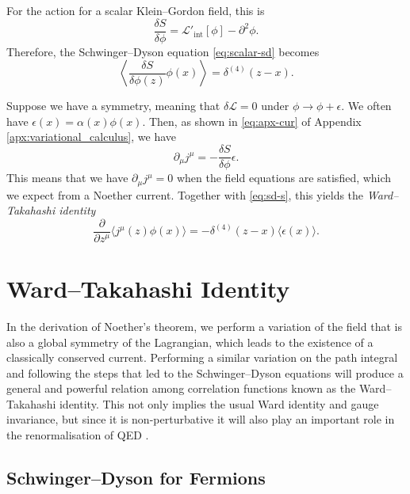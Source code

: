 For the action for a scalar Klein--Gordon field, this is
\begin{equation}
  \frac{\delta S}{\delta \phi} =  \mathscr{L}'_{\text{int}}[\phi] - \partial^2 \phi.
\end{equation}
Therefore, the Schwinger--Dyson equation \eqref{eq:scalar-sd} becomes
\begin{equation}
  \label{eq:sd-s}
  \left\langle \frac{\delta S}{\delta \phi(z)} \phi(x) \right\rangle = \delta^{(4)} (z - x).
\end{equation}

Suppose we have a symmetry, meaning that $\delta \mathscr{L} = 0$ under $\phi \to \phi + \epsilon$. We often have $\epsilon(x) = \alpha(x) \phi(x)$. Then, as shown in \eqref{eq:apx-cur} of Appendix \ref{apx:variational_calculus}, we have
\begin{equation}
  \partial_{\mu} j^{\mu} = - \frac{\delta S}{\delta \phi} \epsilon.
\end{equation}
This means that we have $\partial_{\mu} j^{\mu} = 0$ when the field equations are satisfied, which we expect from a Noether current. Together with \eqref{eq:sd-s}, this yields the \emph{Ward--Takahashi identity}
\begin{equation}
  \frac{\partial }{\partial z^{\mu}} \langle j^{\mu}(z) \phi(x) \rangle = - \delta^{(4)} (z - x) \langle \epsilon(x) \rangle.
\end{equation}

\section{Ward--Takahashi Identity}%
\label{sec:ward_takahashi_identity}

In the derivation of Noether's theorem, we perform a variation of the field that is also a global symmetry of the Lagrangian, which leads to the existence of a classically conserved current.
Performing a similar variation on the path integral and following the steps that led to the Schwinger--Dyson equations will produce a general and powerful relation among correlation functions known as the Ward--Takahashi identity. This not only implies the usual Ward identity and gauge invariance, but since it is non-perturbative it will also play an important role in the renormalisation of QED \cite[Sec.~14.8]{schwartz}.

\subsection{Schwinger--Dyson for Fermions}%
\label{sub:schwinger_dyson_for_fermions}

